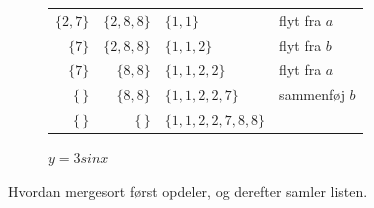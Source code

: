 \begin{figure}
\begin{subfigure}[b]{0.55\textwidth}
\begin{tabular}{rrl|l}
			$\{2,7\}$ &$ \{2,8,8\}$ &  $ \{1,1\}$ & flyt fra $a$\\
			$\{7\}$ &$ \{2,8,8\}$ &  $ \{1,1,2\}$ & flyt fra $b$\\
			$\{7\}$ &$ \{8,8\}$ &  $ \{1,1,2,2\}$ & flyt fra $a$\\
			$\{\,\}$ &$ \{8,8\}$ &  $ \{1,1,2,2,7\}$ & sammenføj $b$\\
			$\{\,\}$ &$ \{\,\}$ &  $ \{1,1,2,2,7,8,8\}$ & \\
		\end{tabular}
         \caption{$y=3sinx$}
         \label{fig:three sin x}
     \end{subfigure}
	\caption{Hvordan mergesort først opdeler, og derefter samler listen. \cite[s. 106]{aogd}}
	\label{fig:mergesort_procedure}
\end{figure}
